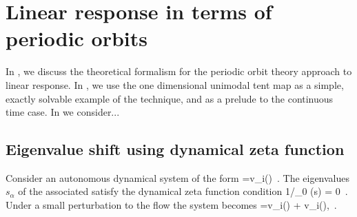 \documentclass[aps,pre,
                showpacs,
                twocolumn,
                groupedaddress,
                superscriptaddress,
                floatfix]{revtex4-1}
\begin{document}
\section{Linear response in terms of periodic orbits}
\label{sect:LinRespPO}

In , we discuss the theoretical formalism for the
periodic orbit theory approach to linear response. In
, we use the one dimensional unimodal tent map as
a simple, exactly solvable example of the technique, and as a prelude to
the continuous time case. In  we consider...

\subsection{Eigenvalue shift using dynamical zeta function}
\label{sect:EigeShiftZeta}

Consider an autonomous dynamical system of the form
\beq
{}=v_{i}(\ssp)
\,.
The eigenvalues $s_{\alpha}$ of the associated {\evOper} satisfy
the dynamical zeta function condition
\beq
{1}/{\zeta_{0} (s)} = 0
\,.
Under a small perturbation to the flow
the system becomes
\beq
{}=v_{i}(\ssp) + \epsilon \delta v_{i}(\ssp), \vert\epsilon\vert {}
\,.
\label{pertflow}
\eeq
\end{document}
